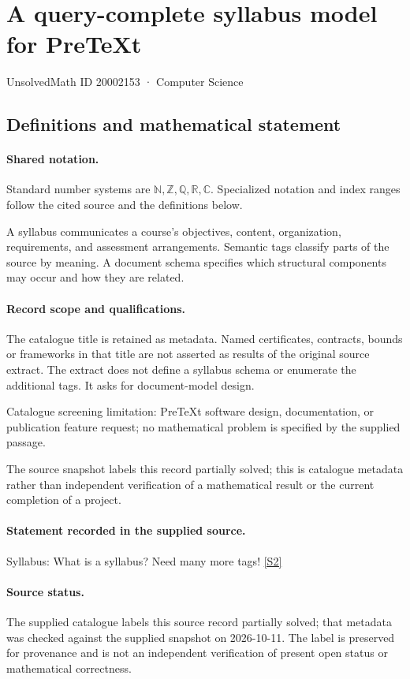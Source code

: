 \documentclass[11pt]{article}
\newcommand{\sref}[2]{\hyperlink{source:#1:#2}{[S#2]}}
\begin{document}
\setcounter{section}{20002152}
\section{A query-complete syllabus model for PreTeXt}\label{20002153}
{\small\sffamily UnsolvedMath ID 20002153 · Computer Science}
\subsection{Definitions and mathematical statement}

\paragraph{Shared notation.}Standard number systems are $\mathbb N,\mathbb Z,\mathbb Q,\mathbb R,\mathbb C$. Specialized notation and index ranges follow the cited source and the definitions below.


A syllabus communicates a course's objectives, content, organization, requirements, and assessment arrangements. Semantic tags classify parts of the source by meaning. A document schema specifies which structural components may occur and how they are related.
\paragraph{Record scope and qualifications.}
The catalogue title is retained as metadata. Named certificates, contracts, bounds or frameworks in that title are not asserted as results of the original source extract.
The extract does not define a syllabus schema or enumerate the additional tags. It asks for document-model design.

Catalogue screening limitation: PreTeXt software design, documentation, or publication feature request; no mathematical problem is specified by the supplied passage.

The source snapshot labels this record partially solved; this is catalogue metadata rather than independent verification of a mathematical result or the current completion of a project.
\paragraph{Statement recorded in the supplied source.}
Syllabus: What is a syllabus? Need many more tags! \sref{20002153}{2}
\paragraph{Source status.}
The supplied catalogue labels this source record partially solved; that metadata was checked against the supplied snapshot on 2026-10-11. The label is preserved for provenance and is not an independent verification of present open status or mathematical correctness.
\end{document}
